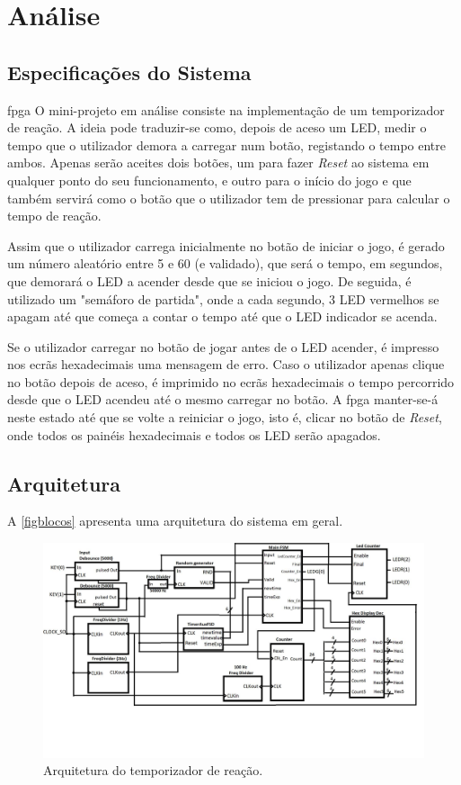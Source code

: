\documentclass[a4paper,11pt,onecolumn]{report}
\begin{document}
\chapter{Análise}
\label{chap.analise}

\section{Especificações do Sistema}\ac{fpga}
O mini-projeto em análise consiste na implementação de um temporizador de reação. A ideia pode traduzir-se como, depois de aceso um LED, medir o tempo que o utilizador demora a carregar num botão, registando o tempo entre ambos. Apenas serão aceites dois botões, um para fazer \textit{Reset} ao sistema em qualquer ponto do seu funcionamento, e outro para o início do jogo e que também servirá como o botão que o utilizador tem de pressionar para calcular o tempo de reação.

Assim que o utilizador carrega inicialmente no botão de iniciar o jogo, é gerado um número aleatório entre 5 e 60 (e validado), que será o tempo, em segundos, que demorará o LED a acender desde que se iniciou o jogo. De seguida, é utilizado um "semáforo de partida", onde a cada segundo, 3 LED vermelhos se apagam até que começa a contar o tempo até que o LED indicador se acenda.

Se o utilizador carregar no botão de jogar antes de o LED acender, é impresso nos ecrãs hexadecimais uma mensagem de erro. Caso o utilizador apenas clique no botão depois de aceso, é imprimido no ecrãs hexadecimais o tempo percorrido desde que o LED acendeu até o mesmo carregar no botão. A \ac{fpga} manter-se-á neste estado até que se volte a reiniciar o jogo, isto é, clicar no botão de \textit{Reset}, onde todos os painéis hexadecimais e todos os LED serão apagados.

\pagebreak

\section{Arquitetura}
A \autoref{figblocos} apresenta uma arquitetura do sistema em geral.

\begin{figure}[h]
\centerline{\includegraphics[scale=0.25]{Images/BlockDiagram}}
\caption{Arquitetura do temporizador de reação.}
\label{figblocos}
\end{figure}
\end{document}
